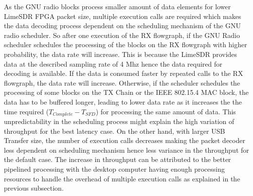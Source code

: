 As the GNU radio blocks process smaller amount of data elements for lower LimeSDR FPGA packet size, multiple execution calls are required which makes the data decoding process dependent on the scheduling mechanism of the GNU radio scheduler. 
So after one execution of the RX flowgraph, if the GNU Radio scheduler schedules the processing of the blocks on the RX flowgraph with higher probability, the data rate will increase.
This is because the LimeSDR provides data at the described sampling rate of 4 Mhz hence the data required for decoding is available.
If the data is consumed faster by repeated calls to the RX flowgraph, the data rate will increase.
Otherwise, if the scheduler schedules the processing of some blocks on the TX Chain or the IEEE 802.15.4 MAC block, the data has to be buffered longer, leading to lower data rate as it increases the the time required ($T_{Complete}- T_{SFD}$) for processing the same amount of data. 
This unpredictability in the scheduling process might explain the high variation of throughput for the best latency case.
On the other hand, with larger USB Transfer size, the number of execution calls decreases making the packet decoder less dependent on scheduling mechanism hence less variance in the throughput for the default case.
The increase in throughput can be attributed to the better pipelined processing with the desktop computer having enough processing resources to handle the overhead of multiple execution calls as explained in the previous subsection.